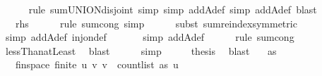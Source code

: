 \begin{isabellebody}
\ \ \ \ \isamarkupfalse%
\ {\isacharparenleft}{\kern0pt}rule\ sum{\isachardot}{\kern0pt}UNION{\isacharunderscore}{\kern0pt}disjoint{\isacharcomma}{\kern0pt}\ simp{\isacharcomma}{\kern0pt}\ simp\ add{\isacharcolon}{\kern0pt}A{\isacharunderscore}{\kern0pt}def{\isacharcomma}{\kern0pt}\ simp\ add{\isacharcolon}{\kern0pt}A{\isacharunderscore}{\kern0pt}def{\isacharcomma}{\kern0pt}\ blast{\isacharparenright}{\kern0pt}\ \isanewline
\ \ \isamarkupfalse%
\ \isamarkupfalse%
\ {\isachardoublequoteopen}{\isachardot}{\kern0pt}{\isachardot}{\kern0pt}{\isachardot}{\kern0pt}\ {\isacharequal}{\kern0pt}\ {\isacharquery}{\kern0pt}rhs{\isachardoublequoteclose}\isanewline
\ \ \ \ \isamarkupfalse%
\ {\isacharparenleft}{\kern0pt}rule\ sum{\isachardot}{\kern0pt}cong{\isacharcomma}{\kern0pt}\ simp{\isacharparenright}{\kern0pt}\isanewline
\ \ \ \ \isamarkupfalse%
\ {\isacharparenleft}{\kern0pt}subst\ sum{\isachardot}{\kern0pt}reindex{\isacharbrackleft}{\kern0pt}symmetric{\isacharbrackright}{\kern0pt}{\isacharparenright}{\kern0pt}\isanewline
\ \ \ \ \ \isamarkupfalse%
\ {\isacharparenleft}{\kern0pt}simp\ add{\isacharcolon}{\kern0pt}A{\isacharunderscore}{\kern0pt}def\ inj{\isacharunderscore}{\kern0pt}on{\isacharunderscore}{\kern0pt}def{\isacharparenright}{\kern0pt}\ \isanewline
\ \ \ \ \isamarkupfalse%
\ {\isacharparenleft}{\kern0pt}simp\ add{\isacharcolon}{\kern0pt}A{\isacharunderscore}{\kern0pt}def{\isacharparenright}{\kern0pt}\isanewline
\ \ \ \ \isamarkupfalse%
\ {\isacharparenleft}{\kern0pt}rule\ sum{\isachardot}{\kern0pt}cong{\isacharparenright}{\kern0pt}\isanewline
\ \ \ \ \isamarkupfalse%
\ lessThan{\isacharunderscore}{\kern0pt}atLeast{}\ \isamarkupfalse%
\ blast\isanewline
\ \ \ \ \isamarkupfalse%
\ simp\isanewline
\ \ \isamarkupfalse%
\ \isamarkupfalse%
\ {\isacharquery}{\kern0pt}thesis\ \isamarkupfalse%
\ blast\isanewline
{}\isamarkupfalse%
%
\endisatagproof
{\isafoldproof}%
%
\isadelimproof
\isanewline
%
\endisadelimproof
\isanewline
{}\isamarkupfalse%
\isanewline
\ \ \ {\isachardoublequoteopen}as\ {\isasymnoteq}\ {\isacharbrackleft}{\kern0pt}{\isacharbrackright}{\kern0pt}{\isachardoublequoteclose}\isanewline
\ \ \ fin{\isacharunderscore}{\kern0pt}space{\isacharcolon}{\kern0pt}\ {\isachardoublequoteopen}finite\ {\isacharbraceleft}{\kern0pt}{\isacharparenleft}{\kern0pt}u{\isacharcomma}{\kern0pt}\ v{\isacharparenright}{\kern0pt}{\isachardot}{\kern0pt}\ v\ {\isacharless}{\kern0pt}\ count{\isacharunderscore}{\kern0pt}list\ as\ u{\isacharbraceright}{\kern0pt}{\isachardoublequoteclose}\ \isanewline

\end{isabellebody}
